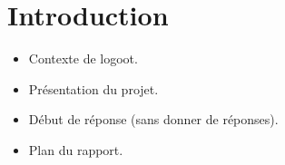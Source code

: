 \chapter*{Introduction}
  \begin{itemize}
    \item Contexte de logoot.
    \item Présentation du projet.
    \item Début de réponse (sans donner de réponses).
    \item Plan du rapport.
  \end{itemize}

